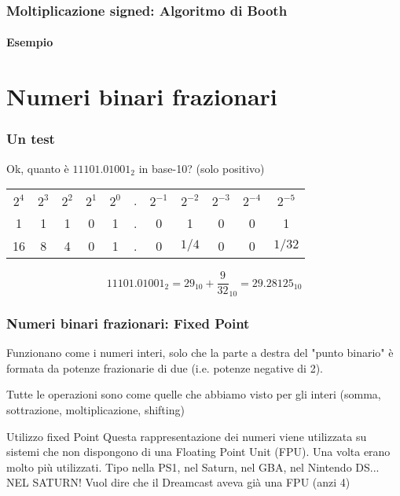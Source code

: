 \documentclass{beamer}
\begin{document}
  \begin{frame}
    \frametitle{Moltiplicazione signed: Algoritmo di Booth}
    \framesubtitle{Esempio}
    
  \end{frame} 
  
  \section[Fixed]{Numeri binari frazionari}
  \begin{frame}
  		\frametitle{Un test}
  		Ok, quanto è $11101.01001_{2}$ in base-10? (solo positivo)
  		
  		\vspace{2em}
    \pause
		\begin{center}
		\begin{tabular}{ccccccccccc} 
		 $2^4$ & $2^3$ & $2^2$ & $2^1$ & $2^0$ & . & $2^{-1}$ & $2^{-2}$ & $2^{-3}$ & $2^{-4}$ & $2^{-5}$ \\		 
		 1 & 1 & 1 & 0 & 1 & . & 0 & 1 & 0 & 0 & 1 \\ 
		\hline 
		 16 & 8 & 4 & 0 & 1 & . & 0 & $1/4$ & 0 & 0 & $1/32$ \\ 
		\end{tabular}
		\end{center}
		\pause
		\vspace{2em}
		
		$$11101.01001_{2} = 29_{10} + \frac{9}{32}_{10} = 29.28125_{10} $$
  		
  \end{frame}
  \begin{frame}
  		\frametitle{Numeri binari frazionari: Fixed Point}
  		Funzionano come i numeri interi, solo che la parte a destra del "punto binario" è formata
  		da potenze frazionarie di due (i.e. potenze negative di 2).
  		
  		\vspace{2em}
  		
  	  Tutte le operazioni sono come quelle che abbiamo visto per gli interi (somma, sottrazione, moltiplicazione, shifting)
  	  
  	  \vspace{2em}
  	  
  	  \begin{block}{Utilizzo fixed Point}
  	  		Questa rappresentazione dei numeri viene utilizzata su sistemi che non dispongono di una Floating
  	  		Point Unit (FPU). Una volta erano molto più utilizzati. Tipo nella PS1, nel Saturn, nel GBA, nel
  	  		Nintendo DS... NEL SATURN! Vuol dire che il Dreamcast aveva già una FPU (anzi 4)
  	  \end{block}
    
  \end{frame}
\end{document}
